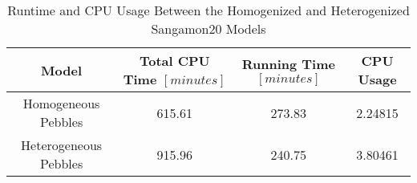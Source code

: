 \begin{table}[h!]
\centering
\caption{Runtime and CPU Usage Between the Homogenized and Heterogenized Sangamon20 Models}
\begin{tabular}{ c  c  c  c }
\hline
Model & Total CPU Time $\left[ minutes \right]$ & Running Time $\left[ minutes \right]$ & CPU Usage \\
\hline
Homogeneous Pebbles & 615.61 & 273.83 & 2.24815  \\
Heterogeneous Pebbles & 915.96 & 240.75 & 3.80461 \\
\hline
\end{tabular}

\label{table:cpu-params}
\end{table}